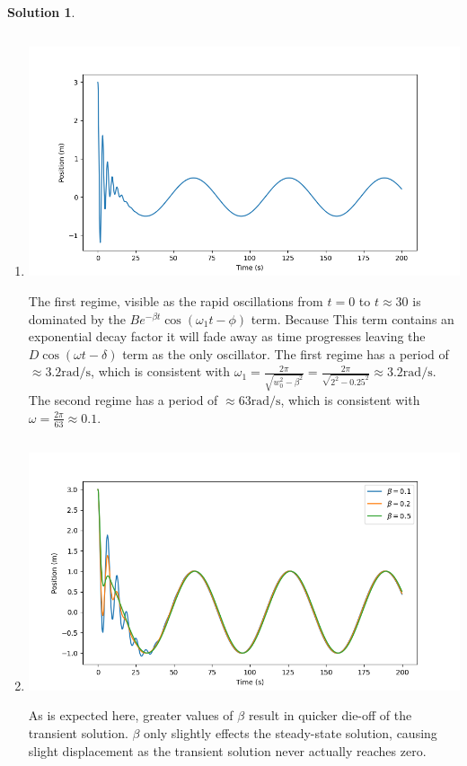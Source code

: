 \documentclass[10pt]{article}
\theoremstyle{definition}
\newtheorem{soln}{Solution}
\begin{document}
\begin{soln}
\begin{enumerate}[label=(\alph*)]
            \item \inputminted[breaklines, autogobble]{python3}{./python/q1/q1d.py}
                  \begin{center}
                        \includegraphics[scale=0.75]{Figure_1.png}
                  \end{center}
                  The first regime, visible as the rapid oscillations from $t=0$ to $t\approx 30$ is dominated by the $Be^{-\beta t}\cos\left(\omega_1 t-\phi\right)$ term. Because
                  This term contains an exponential decay factor it will fade away as time progresses leaving the $D\cos\left(\omega t-\delta\right)$ term as the only oscillator.
                  The first regime has a period of $\approx 3.2\unit{\radian\per\second}$, which is consistent with $\omega_1=\frac{2\pi}{\sqrt{w_0^2-\beta^2}}=\frac{2\pi}{\sqrt{2^2-0.25^2}}\approx 3.2\unit{\radian\per\second}$.
                  The second regime has a period of $\approx 63\unit{\radian\per\second}$, which is consistent with $\omega=\frac{2\pi}{63}\approx0.1$.

            \item \inputminted[breaklines, autogobble]{python3}{./python/q1/q1e.py}
                  \begin{center}
                        \includegraphics[scale=0.75]{Figure_2.png}
                  \end{center}
                  As is expected here, greater values of $\beta$ result in quicker die-off of the transient solution. $\beta$ only slightly effects
                  the steady-state solution, causing slight displacement as the transient solution never actually reaches zero.


\end{enumerate}
\end{soln}
\end{document}
